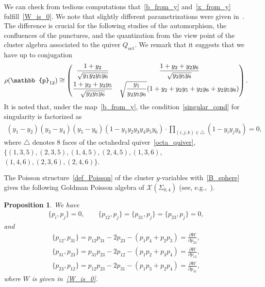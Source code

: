 \documentclass[pdftex]{sigma}
\numberwithin{equation}{section}
\newtheorem{Proposition}[Theorem]{Proposition}
 { \theoremstyle{definition}
\newtheorem{Definition}[Theorem]{Definition}
\newtheorem{Note}[Theorem]{Note}
\newtheorem{Example}[Theorem]{Example}
\newtheorem{Remark}[Theorem]{Remark} }
\begin{document}
We can check from tedious computations that~\eqref{b_from_y} and~\eqref{x_from_y} fulfill~\eqref{W_is_0}. We note that slightly different parametrizations were given in~\cite{ChekhMazzo10a,ComaGabeTesc15a, GaioMoorNeit13a}.
The difference is crucial for the following studies of the automorphism, the confluences of the punctures, and the quantization from the view point of the cluster algebra associated to the quiver $Q_{\text{oct}}$. We remark that it suggests that we have up to conjugation
\begin{gather*}
 \rho(\mathbb{p}_{12}) \cong
 \begin{pmatrix}
 \dfrac{1+y_2}{ \sqrt{y_1 y_2 y_5 y_6} } & \dfrac{1+y_2 + y_2 y_6}{\sqrt{y_2 y_5 y_6}} \vspace{1mm}\\
 \dfrac{1+y_2 + y_2 y_5}{\sqrt{y_2 y_5 y_6}} & \sqrt{\dfrac{y_1}{y_2 y_5 y_6}}( 1+y_2 + y_2 y_5 + y_2 y_6 + y_2 y_5 y_6)
 \end{pmatrix} .
\end{gather*}
It is noted that, under the map~\eqref{b_from_y}, the condition~\eqref{singular_cond} for singularity is factorized as
\begin{gather*}
(y_1-y_2) ( y_3 - y_4) ( y_5-y_6 ) ( 1-y_1 y_2 y_3 y_4 y_5 y_6 )\cdot \prod_{(i,j,k) \in \triangle} ( 1-y_i y_j y_k ) =0 ,
\end{gather*}
where $\triangle$ denotes $8$ faces of the octahedral quiver~\eqref{octa_quiver}, $\{ (1{,}3{,}5), (2{,}3{,}5), (1{,}4{,}5), (2{,}4{,}5), (1{,}3{,}6)$, $(1,4,6), (2,3,6), (2,4,6)\}$.

The Poisson structure~\eqref{def_Poisson} of the cluster $y$-variables with~\eqref{B_sphere} gives the following Goldman Poisson algebra of $\mathcal{X}(\Sigma_{0,4})$ (see, e.g.,~\cite{ChekhMazzo10a,ChekMazzRubt15a,NekrRoslShat11a}).

\begin{Proposition} \label{prop:Poisson_x_b} We have
 \begin{gather} \label{b_b_Poisson}
\{ p_i, p_j \} = 0 ,\qquad \{ p_{12} , p_j \} = \{ p_{31} , p_j \} =\{ p_{23} , p_j\} = 0 ,
 \end{gather}
 and
 \begin{gather}
\{ p_{12}, p_{31} \} = p_{12} p_{31} - 2 p_{23} - ( p_1 p_4 + p_2 p_3 ) = \frac{\partial W}{\partial p_{23}} ,\nonumber \\
\{ p_{31} , p_{23}\} = p_{31} p_{23} - 2 p_{12} - ( p_1 p_2 + p_3 p_4 ) = \frac{\partial W}{\partial p_{12}} ,\nonumber \\
\{ p_{23} , p_{12} \} = p_{12} p_{23} - 2 p_{31} - ( p_1 p_3 + p_2 p_4 ) = \frac{\partial W}{\partial p_{31}} , \label{x_x_Poisson}
 \end{gather}
 where $W$ is given in~\eqref{W_is_0}.
\end{Proposition}
\end{document}
